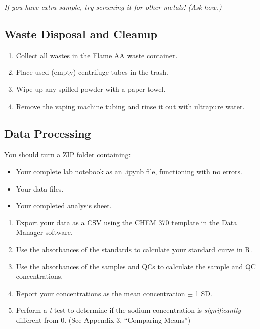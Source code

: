 \documentclass[]{tufte-book}
\providecommand{\tightlist}{%
  \setlength{\itemsep}{0pt}\setlength{\parskip}{0pt}}
\begin{document}
\emph{If you have extra sample, try screening it for other metals! (Ask how.)}

\hypertarget{waste-disposal-and-cleanup-2}{%
\subsection{Waste Disposal and Cleanup}\label{waste-disposal-and-cleanup-2}}

\begin{enumerate}
\def\labelenumi{\arabic{enumi}.}
\tightlist
\item
  Collect all wastes in the Flame AA waste container.
\item
  Place used (empty) centrifuge tubes in the trash.
\item
  Wipe up any spilled powder with a paper towel.
\item
  Remove the vaping machine tubing and rinse it out with ultrapure water.
\end{enumerate}

\hypertarget{data-processing-3}{%
\subsection{Data Processing}\label{data-processing-3}}

\begin{marginfigure}
You should turn a ZIP folder containing:

\begin{itemize}
\tightlist
\item
  Your complete lab notebook as an .ipynb file, functioning with no
  errors.\\
\item
  Your data files.\\
\item
  Your completed
  \href{https://github.com/alphonse/alphonse.github.io/raw/master/chem370/assignments/excel-templates/rotation_faas_data-analysis.xlsx}{analysis
  sheet}.
\end{itemize}
\end{marginfigure}

\begin{enumerate}
\def\labelenumi{\arabic{enumi}.}
\tightlist
\item
  Export your data as a CSV using the CHEM 370 template in the Data Manager software.
\item
  Use the absorbances of the standards to calculate your standard curve in R.
\item
  Use the absorbances of the samples and QCs to calculate the sample and QC concentrations.
\item
  Report your concentrations as the mean concentration \(\pm\) 1 SD.
\item
  Perform a \emph{t}-test to determine if the sodium concentration is \emph{significantly} different from 0. (See Appendix 3, ``Comparing Means'')
\end{enumerate}
\end{document}
